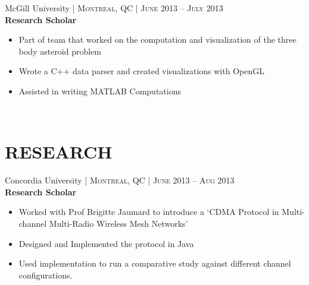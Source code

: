 \documentclass[10pt]{article} %
\begin{document}
{\begin{minipage}[t]{0.57\textwidth}


{\raggedright\large McGill University \normalsize\textsc{ | Montreal, QC | June 2013 -- July 2013}\\
\textbf{Research Scholar}\\[5pt]}
\begin{itemize}\itemsep-0.25em \item Part of team that worked on the computation and visualization of the three body asteroid problem \item Wrote a C++ data parser and created visualizations with OpenGL \item Assisted in writing MATLAB Computations
\end{itemize}\\

\section{\uppercase{\textbf{Research}}}


{\raggedright\large Concordia University \normalsize\textsc{ | Montreal, QC | June 2013 -- Aug 2013}\\
\textbf{Research Scholar}\\[5pt]}
\begin{itemize}\itemsep-0.25em \item Worked with Prof Brigitte Jaumard to introduce a ‘CDMA Protocol in Multi-channel Multi-Radio Wireless Mesh Networks’ \item  Designed and Implemented the protocol in Java \item Used implementation to run a comparative study against different channel configurations.\end{itemize}\\




\end{minipage}}
\end{document}
